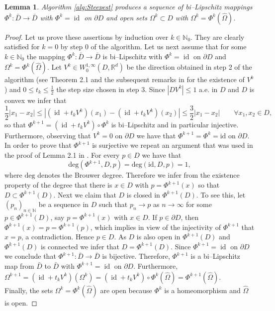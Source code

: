 \documentclass[a4paper,10pt]{article}
\newcommand{\Omref}{\hat \Omega}
\theoremstyle{plain}
\newtheorem{lemma}[thm]{Lemma}
\theoremstyle{plain}
\numberwithin{equation}{section}
\DeclareMathOperator{\id}{id}
\begin{document}
\begin{lemma} \label{lem:propalg}
Algorithm \ref{alg:Steepest} produces a sequence of bi--Lipschitz mappings $\Phi^k: \bar D \rightarrow \bar D$ with
$\Phi^k=\id$ on $\partial D$ and open sets $\Omega^k \subset D$ with $\Omega^k= \Phi^k(\Omref)$.
\end{lemma}
\begin{proof} Let us prove these assertions by induction over $k \in \mathbb N_0$. They are clearly
satisfied for $k=0$ by step 0 of the algorithm.  Let us
next assume that for some $k \in \mathbb N_0$ the mapping $\Phi^k:
\bar D \rightarrow \bar D$ is bi--Lipschitz with $\Phi^k=\id$ on $\partial D$ and $\Omega^k=\Phi^k(\Omref)$. 
Let $V^k \in W^{1,\infty}_0(D,\mathbb R^d)$ be the direction obtained in step 2 of the algorithm (see
Theorem 2.1 and the subsequent remarks in \cite{Deckelnick26122024} for the existence of $V^k$) and $0 \leq t_k \leq \frac{1}{2}$ the step size chosen in step 3.   Since $
 | DV^k | \leq 1$ a.e. in $D$ and $D$ is convex we infer that 
\begin{displaymath}
\frac{1}{2} | x_1 -x_2 | \leq | (\id+t_k V^k)(x_1) - (\id+t_k V^k)(x_2)| \leq \frac{3}{2} | x_1 - x_2 | \qquad \forall x_1,x_2 \in D,
\end{displaymath}
so that $\Phi^{k+1}=(\id+t_k V^k) \circ \Phi^k$ is bi--Lipschitz and in particular injective.
Furthermore, observing that  $V^k=0$ on $\partial D$ we have  that $\Phi^{k+1}=\Phi^k=\mbox{id}$ on $\partial D$. \\
In order to prove that $\Phi^{k+1}$ is surjective we repeat an argument that was
used  in the proof of Lemma 2.1 in \cite{DHH25-convergence}. For
every $p \in D$ we have that
\begin{displaymath}
\mbox{deg}(\Phi^{k+1},D,p) = \mbox{deg}(\mbox{id},D,p)=1,
\end{displaymath}
where $\mbox{deg}$ denotes the Brouwer degree. Therefore we infer from the existence property of the degree that there is $x \in D$ with $p=\Phi^{k+1}(x)$ so
that $D \subset \Phi^{k+1}(D)$. Next we claim that $D$ is closed in $\Phi^{k+1}(D)$. To see this,
let $(p_n)_{n \in \mathbb N}$ be a sequence in $D$ such that $p_n \rightarrow p$ as $n \rightarrow \infty$ for some $p \in \Phi^{k+1}(D)$, say $p=\Phi^{k+1}(x)$ with
$x \in D$. If $p \in \partial D$, then $\Phi^{k+1}(x)=p=\Phi^{k+1}(p)$, which implies in view of the  injectivity of $\Phi^{k+1}$ that $x=p$,
a contradiction. Hence $p \in D$. As $D$ is also open in $\Phi^{k+1}(D)$ and $\Phi^{k+1}(D)$ is connected we infer that $D=\Phi^{k+1}(D)$. Since  $\Phi^{k+1}=\id$ on $\partial D$ we conclude that $\Phi^{k+1}:\bar D \rightarrow \bar D$ is bijective. Therefore, 
$\Phi^{k+1}$ is a bi--Lipschitz map  from $\bar D$ to $\bar D$ with $\Phi^{k+1}=\id$ on $\partial D$. Furthermore,
$\Omega^{k+1}=(\id+t_k V^k)(\Omega^k)=(\id+t_k V^k) \circ \Phi^k(\Omref)=\Phi^{k+1}(\Omref)$. \\
Finally, the sets  $\Omega^{k}=\Phi^k(\Omref)$  are open because $\Phi^k$ is a homeomorphism and
$\Omref$ is open. 
\end{proof}
\end{document}
